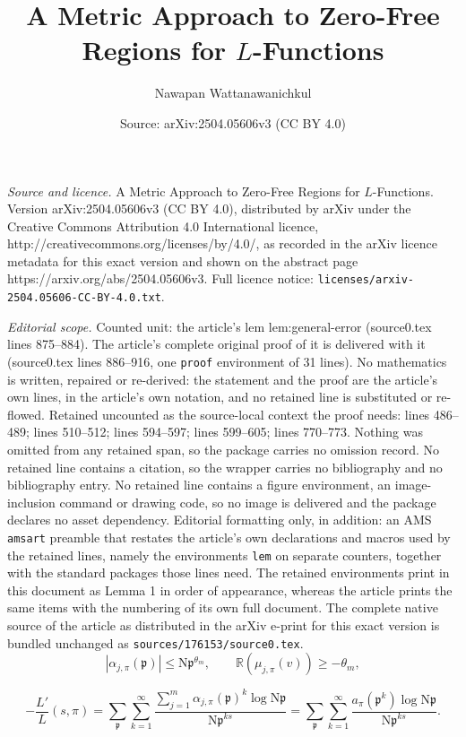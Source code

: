 \documentclass[10pt,a4paper]{amsart}
\title{A Metric Approach to Zero-Free Regions for $L$-Functions}
\author{Nawapan Wattanawanichkul}
\date{Source: arXiv:2504.05606v3 (CC BY 4.0)}
\newcommand{\N}{\mathrm{N}}
\newcommand{\kp}{\mathfrak{p}}
\newcommand{\re}{\mathbb{R}}
\begin{document}
\maketitle

\noindent\emph{Source and licence.} A Metric Approach to Zero-Free Regions for $L$-Functions. Version arXiv:2504.05606v3 (CC BY 4.0), distributed by arXiv under the Creative Commons Attribution 4.0 International licence, http://creativecommons.org/licenses/by/4.0/, as recorded in the arXiv licence metadata for this exact version and shown on the abstract page https://arxiv.org/abs/2504.05606v3. Full licence notice: \texttt{licenses/arxiv-2504.05606-CC-BY-4.0.txt}.\par\smallskip

\noindent\textit{Editorial scope.} Counted unit: the article's lem lem:general-error (source0.tex lines 875--884). The article's complete original proof of it is delivered with it (source0.tex lines 886--916, one \texttt{proof} environment of 31 lines). No mathematics is written, repaired or re-derived: the statement and the proof are the article's own lines, in the article's own notation, and no retained line is substituted or re-flowed.  Retained uncounted as the source-local context the proof needs: lines 486--489; lines 510--512; lines 594--597; lines 599--605; lines 770--773.  Nothing was omitted from any retained span, so the package carries no omission record.  No retained line contains a citation, so the wrapper carries no bibliography and no bibliography entry.  No retained line contains a figure environment, an image-inclusion command or drawing code, so no image is delivered and the package declares no asset dependency.  Editorial formatting only, in addition: an AMS \texttt{amsart} preamble that restates the article's own declarations and macros used by the retained lines, namely the environments \texttt{lem} on separate counters, together with the standard packages those lines need.  The retained environments print in this document as Lemma 1 in order of appearance, whereas the article prints the same items with the numbering of its own full document.  The complete native source of the article as distributed in the arXiv e-print for this exact version is bundled unchanged as \texttt{sources/176153/source0.tex}.
\begin{equation}
\label{eqn:GRC1}
|\alpha_{j,\pi}(\kp)|\leq \N\kp^{\theta_m},\qquad \re(\mu_{j,\pi}(v))\geq -\theta_m,
\end{equation}

	\begin{equation}\label{eq:-L'/L}
	-\frac{L'}{L}(s,\pi) = \sum_{\kp}\sum_{k=1}^{\infty} \frac{\sum_{j=1}^{m} \alpha_{j, \pi}(\kp)^k\log \N\kp}{\N\kp^{ks}}= \sum_{\kp}\sum_{k=1}^{\infty} \frac{a_{\pi}(\kp^k)\log \N\kp}{\N\kp^{ks}}.
	\end{equation}
\end{document}

